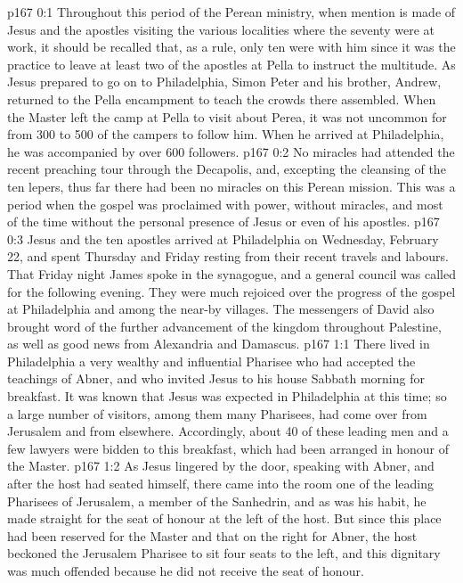 \author{Midwayer Commission}
\vs p167 0:1 Throughout this period of the Perean ministry, when mention is made of Jesus and the apostles visiting the various localities where the seventy were at work, it should be recalled that, as a rule, only ten were with him since it was the practice to leave at least two of the apostles at Pella to instruct the multitude. As Jesus prepared to go on to Philadelphia, Simon Peter and his brother, Andrew, returned to the Pella encampment to teach the crowds there assembled. When the Master left the camp at Pella to visit about Perea, it was not uncommon for from 300 to 500 of the campers to follow him. When he arrived at Philadelphia, he was accompanied by over 600 followers.
\vs p167 0:2 No miracles had attended the recent preaching tour through the Decapolis, and, excepting the cleansing of the ten lepers, thus far there had been no miracles on this Perean mission. This was a period when the gospel was proclaimed with power, without miracles, and most of the time without the personal presence of Jesus or even of his apostles.
\vs p167 0:3 \pc Jesus and the ten apostles arrived at Philadelphia on Wednesday, February 22, and spent Thursday and Friday resting from their recent travels and labours. That Friday night James spoke in the synagogue, and a general council was called for the following evening. They were much rejoiced over the progress of the gospel at Philadelphia and among the near-by villages. The messengers of David also brought word of the further advancement of the kingdom throughout Palestine, as well as good news from Alexandria and Damascus.
\vs p167 1:1 There lived in Philadelphia a very wealthy and influential Pharisee who had accepted the teachings of Abner, and who invited Jesus to his house Sabbath morning for breakfast. It was known that Jesus was expected in Philadelphia at this time; so a large number of visitors, among them many Pharisees, had come over from Jerusalem and from elsewhere. Accordingly, about 40 of these leading men and a few lawyers were bidden to this breakfast, which had been arranged in honour of the Master.
\vs p167 1:2 As Jesus lingered by the door, speaking with Abner, and after the host had seated himself, there came into the room one of the leading Pharisees of Jerusalem, a member of the Sanhedrin, and as was his habit, he made straight for the seat of honour at the left of the host. But since this place had been reserved for the Master and that on the right for Abner, the host beckoned the Jerusalem Pharisee to sit four seats to the left, and this dignitary was much offended because he did not receive the seat of honour.
